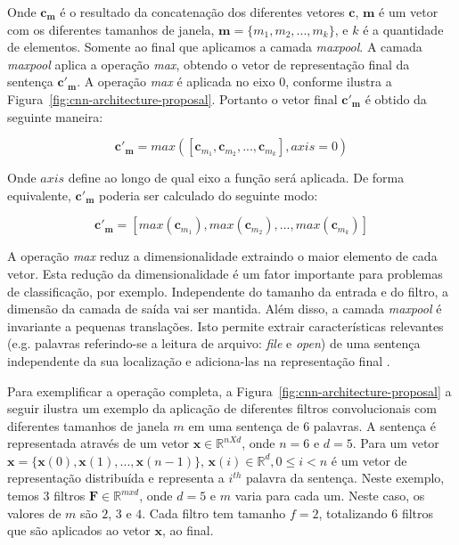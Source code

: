 Onde $\bm{c}_{\bm{m}}$ é o resultado da concatenação dos diferentes vetores $\bm{c}$, $\bm{m}$ é um vetor com os diferentes tamanhos de janela, $\bm{m} = \{m_1, m_2, . . ., m_{k}\}$, e $k$ é a quantidade de elementos. Somente ao final que aplicamos a camada \textit{maxpool}. A camada \textit{maxpool} aplica a operação \textit{max}, obtendo o vetor de representação final da sentença $\bm{c'}_{\bm{m}}$. A operação \textit{max} é aplicada no eixo $0$, conforme ilustra a Figura~\ref{fig:cnn-architecture-proposal}. Portanto o vetor final $\bm{c'}_{\bm{m}}$ é obtido da seguinte maneira:

\begin{equation}
    \bm{c'}_{\bm{m}} = max\left(\left[\bm{c}_{m_1}, \bm{c}_{m_2}, . . ., \bm{c}_{m_k}\right], axis = 0\right)
\end{equation}

Onde $axis$ define ao longo de qual eixo a função será aplicada. De forma equivalente, $\bm{c'}_{\bm{m}}$ poderia ser calculado do seguinte modo:

\begin{equation}\label{eq:final_representation_cnn}
    \bm{c'}_{\bm{m}} = \left[max(\bm{c}_{m_1}), max(\bm{c}_{m_2}), . . ., max(\bm{c}_{m_k})\right]
\end{equation}

A operação \textit{max} reduz a dimensionalidade extraindo o maior elemento de cada vetor. Esta redução da dimensionalidade é um fator importante para problemas de classificação, por exemplo. Independente do tamanho da entrada e do filtro, a dimensão da camada de saída vai ser mantida. Além disso, a camada \textit{maxpool} é invariante a pequenas translações. Isto permite extrair características relevantes (e.g. palavras referindo-se a leitura de arquivo: \emph{file} e \emph{open}) de uma sentença independente da sua localização e adiciona-las na representação final \citep{tom-young:trends-deep-learning-nlp}.

Para exemplificar a operação completa, a Figura~\ref{fig:cnn-architecture-proposal} a seguir ilustra um exemplo da aplicação de diferentes filtros convolucionais com diferentes tamanhos de janela $m$ em uma sentença de 6 palavras. A sentença é representada através de um vetor $\bm{x} \in \mathbb{R}^{n X d}$, onde $n = 6$ e $d = 5$. Para um vetor $\bm{x} = \{\bm{x}(0), \bm{x}(1), . . ., \bm{x}(n - 1) \}$, $\bm{x}(i) \in \mathbb{R}^{d}, 0 \leq i < n$ é um vetor de representação distribuída e representa a $i^{th}$ palavra da sentença. Neste exemplo, temos 3 filtros $\bm{F} \in \mathbb{R}^{m x d}$, onde $d = 5$ e $m$ varia para cada um. Neste caso, os valores de $m$ são $2$, $3$ e $4$. Cada filtro tem tamanho $f = 2$, totalizando 6 filtros que são aplicados ao vetor $\bm{x}$, ao final.

